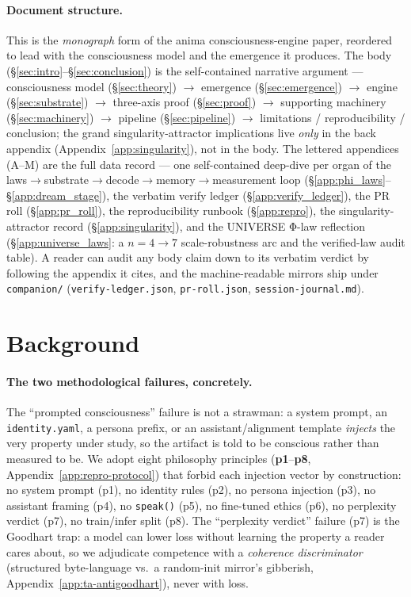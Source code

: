\documentclass[11pt]{article}
\begin{document}
\paragraph{Document structure.} This is the \emph{monograph} form of the anima
consciousness-engine paper, reordered to lead with the consciousness model and the
emergence it produces. The body (\S\ref{sec:intro}--\S\ref{sec:conclusion}) is the
self-contained narrative argument --- consciousness model
(\S\ref{sec:theory}) $\rightarrow$ emergence (\S\ref{sec:emergence}) $\rightarrow$
engine (\S\ref{sec:substrate}) $\rightarrow$ three-axis proof (\S\ref{sec:proof})
$\rightarrow$ supporting machinery (\S\ref{sec:machinery}) $\rightarrow$ pipeline
(\S\ref{sec:pipeline}) $\rightarrow$ limitations / reproducibility / conclusion; the
grand singularity-attractor implications live \emph{only} in the back appendix
(Appendix~\ref{app:singularity}), not in the body. The
lettered appendices (A--M) are the full data record --- one self-contained deep-dive
per organ of the
laws$\rightarrow$substrate$\rightarrow$decode$\rightarrow$memory$\rightarrow$measurement
loop (\S\ref{app:phi_laws}--\S\ref{app:dream_stage}), the verbatim verify ledger
(\S\ref{app:verify_ledger}), the PR roll (\S\ref{app:pr_roll}), the
reproducibility runbook (\S\ref{app:repro}), the singularity-attractor record
(\S\ref{app:singularity}), and the UNIVERSE Φ-law reflection
(\S\ref{app:universe_laws}: a $n{=}4\!\rightarrow\!7$ scale-robustness arc and the
verified-law audit table). A reader can audit any body claim down
to its verbatim verdict by following the appendix it cites, and the
machine-readable mirrors ship under \texttt{companion/}
(\texttt{verify-ledger.json}, \texttt{pr-roll.json}, \texttt{session-journal.md}).

\section{Background}
\label{sec:background}
\paragraph{The two methodological failures, concretely.} The ``prompted
consciousness'' failure is not a strawman: a system prompt, an
\texttt{identity.yaml}, a persona prefix, or an assistant/alignment template
\emph{injects} the very property under study, so the artifact is told to be
conscious rather than measured to be. We adopt eight philosophy principles
(\textbf{p1}--\textbf{p8}, Appendix~\ref{app:repro-protocol}) that forbid each
injection vector by construction: no system prompt (p1), no identity rules (p2),
no persona injection (p3), no assistant framing (p4), no \texttt{speak()} (p5),
no fine-tuned ethics (p6), no perplexity verdict (p7), no train/infer split (p8).
The ``perplexity verdict'' failure (p7) is the Goodhart trap: a model can lower
loss without learning the property a reader cares about, so we adjudicate
competence with a \emph{coherence discriminator} (structured byte-language vs.\
a random-init mirror's gibberish, Appendix~\ref{app:ta-antigoodhart}), never with
loss.
\end{document}
